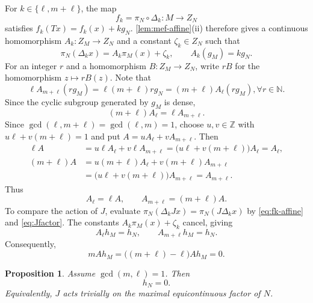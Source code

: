 \documentclass[reqno,12pt]{amsart}
\newtheorem{prop}[thm]{Proposition}
\def \Z {\mathbb Z}
\numberwithin{equation}{section}
\begin{document}
For $k\in\{\ell,m+\ell\}$, the map
\[
 f_k=\pi_N\circ\Delta_k:M\to Z_N
\]
satisfies $f_k(Tx)=f_k(x)+kg_N$. \cref{lem:mef-affine}(ii) therefore
gives a continuous homomorphism $A_k:Z_M\to Z_N$ and a constant
$\zeta_k\in Z_N$ such that
\begin{equation}\label{eq:fk-affine}
 \pi_N(\Delta_kx)=A_k\pi_M(x)+\zeta_k,
 \qquad
 A_k(g_M)=kg_N.
\end{equation}
For an integer $r$ and a homomorphism $B:Z_M\to Z_N$, write
$rB$ for the homomorphism $z\mapsto rB(z)$. Note that 
\[\ell A_{m+\ell}(rg_M)=\ell(m+\ell)rg_N=(m+\ell)A_\ell(rg_M), \forall r\in\mathbb{N}.\] Since the cyclic subgroup
generated by $g_M$ is dense,
\[
 (m+\ell)A_\ell=\ell A_{m+\ell}.
\]
Since $\gcd(\ell,m+\ell)=\gcd(\ell,m)=1$, choose $u,v\in\Z$ with
$u\ell+v(m+\ell)=1$ and put
$A=uA_\ell+vA_{m+\ell}$. Then
\[
 \begin{aligned}
 \ell A
 &=u\ell A_\ell+v\ell A_{m+\ell}
   =\bigl(u\ell+v(m+\ell)\bigr)A_\ell=A_\ell,\\
 (m+\ell)A
 &=u(m+\ell)A_\ell+v(m+\ell)A_{m+\ell}\\
 &=\bigl(u\ell+v(m+\ell)\bigr)A_{m+\ell}=A_{m+\ell}.
 \end{aligned}
\]
Thus
\begin{equation}\label{eq:AkA}
 A_\ell=\ell A,
 \qquad
 A_{m+\ell}=(m+\ell)A.
\end{equation}
To compare the action of $J$, evaluate
$\pi_N(\Delta_kJx)=\pi_N(J\Delta_kx)$ by
\eqref{eq:fk-affine} and \eqref{eq:Jfactor}.  The constants
$A_k\pi_M(x)+\zeta_k$ cancel, giving
\begin{equation}\label{eq:Ah-relations}
 A_\ell h_M=h_N,
 \qquad
 A_{m+\ell}h_M=h_N.
\end{equation}
Consequently,
\begin{equation}\label{eq:mAh}
 mAh_M=\bigl((m+\ell)-\ell\bigr)Ah_M=0.
\end{equation}

\begin{prop}%
\label{prop:Jtrivial}
Assume $\gcd(m,\ell)=1$. Then
\[
 h_N=0.
\]
Equivalently, $J$ acts trivially on the maximal equicontinuous factor of $N$.
\end{prop}
\end{document}
